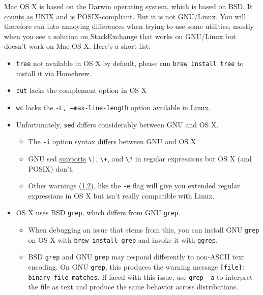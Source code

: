 Mac OS X is based on the Darwin operating system, which is based on BSD.
It \href{https://www.opengroup.org/openbrand/register/apple.htm}{counts as UNIX} and is POSIX-compliant.
But it is not GNU/Linux.
You will therefore run into annoying differences when trying to use some utilities, mostly when you see a solution on StackExchange that works on GNU/Linux but doesn't work on Mac OS X.
Here's a short list:
\begin{itemize}
\item \texttt{tree} not available in OS X by default, please run \texttt{brew install tree} to install it via Homebrew.
\item \texttt{cut} lacks the complement option in OS X
\item \texttt{wc} lacks the \texttt{-L, --max-line-length} option available in \href{https://linux.die.net/man/1/wc}{Linux}.
\item Unfortunately, \texttt{sed} differs considerably between GNU and OS X.
\begin{itemize}
	\item The \texttt{-i} option syntax \href{https://stackoverflow.com/questions/2320564/i-need-my-sed-i-command-for-in-place-editing-to-work-with-both-gnu-sed-and-bsd}{differs} between GNU and OS X
	\item GNU sed \href{https://unix.stackexchange.com/questions/13711/differences-between-sed-on-mac-osx-and-other-standard-sed}{supports} \texttt{\textbackslash|}, \texttt{\textbackslash+}, and \texttt{\textbackslash?} in regular expressions but OS X (and POSIX) don't.
	\item Other warnings (\href{https://unix.stackexchange.com/a/131940}{1},\href{https://stackoverflow.com/questions/1227174/sed-on-os-x-cant-seem-to-use-in-regexps}{2}), like the \texttt{-e} flag will give you extended regular expressions in OS X but isn't really compatible with Linux.
\end{itemize}

\item OS X uses BSD \texttt{grep}, which differs from GNU \texttt{grep}. 
\begin{itemize}
    \item When debugging an issue that stems from this, you can install GNU
        \texttt{grep} on OS X with \texttt{brew install grep} and invoke it with \texttt{ggrep}.
    \item BSD \texttt{grep} and GNU \texttt{grep} may respond differently to non-ASCII text encoding.
        On GNU \texttt{grep}, this produces the warning message \texttt{[file]: binary file matches}.
        If faced with this issue, use \texttt{grep -a} to interpret the file as text
        and produce the same behavior across distributions.
\end{itemize}

\end{itemize}

